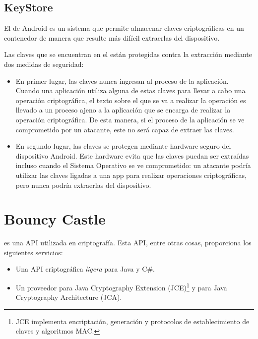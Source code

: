 \subsection{KeyStore}

\label{KeyStore}

El  de Android es un sistema que permite almacenar claves
criptográficas en un contenedor de manera que resulte más difícil extraerlas del
dispositivo.

Las claves que se encuentran en el  están protegidas contra la
extracción mediante dos medidas de seguridad:

\begin{itemize}
  \item En primer lugar, las claves nunca ingresan al proceso de la aplicación.
  Cuando una aplicación utiliza alguna de estas claves para llevar a cabo una
  operación criptográfica, el texto sobre el que se va a realizar la operación
  es llevado a un proceso ajeno a la aplicación que se encarga de realizar la
  operación criptográfica. De esta manera, si el proceso de la aplicación se ve
  comprometido por un atacante, este no será capaz de extraer las claves.

  \item En segundo lugar, las claves se protegen mediante hardware seguro del
  dispositivo Android. Este hardware evita que las claves puedan ser extraídas
  incluso cuando el Sistema Operativo se ve comprometido: un atacante podría
  utilizar las claves ligadas a una app para realizar operaciones
  criptográficas, pero nunca podría extraerlas del dispositivo.
\end{itemize}

\emph{\parencite{Reference33}}


\section{Bouncy Castle}

 es una API utilizada en criptografía.
Esta API, entre otras cosas, proporciona los siguientes servicios:
\begin{itemize}
  \item Una API criptográfica \emph{ligera} para Java y C\#.
  \item Un proveedor para Java Cryptography Extension (JCE)\footnote{JCE implementa encriptación, generación y protocolos de establecimiento de claves y algoritmos MAC.} y para Java Cryptography Architecture (JCA).
\end{itemize}

